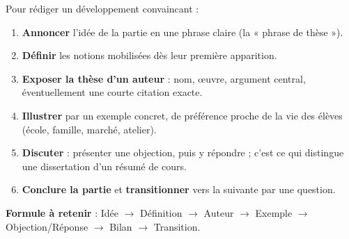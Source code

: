 \documentclass[11pt]{article}
\begin{document}
\begin{methode}
Pour rédiger un développement convaincant :
\begin{enumerate}
\item \textbf{Annoncer} l'idée de la partie en une phrase claire (la « phrase de thèse »).
\item \textbf{Définir} les notions mobilisées dès leur première apparition.
\item \textbf{Exposer la thèse d'un auteur} : nom, œuvre, argument central, éventuellement une courte citation exacte.
\item \textbf{Illustrer} par un exemple concret, de préférence proche de la vie des élèves (école, famille, marché, atelier).
\item \textbf{Discuter} : présenter une objection, puis y répondre ; c'est ce qui distingue une dissertation d'un résumé de cours.
\item \textbf{Conclure la partie} et \textbf{transitionner} vers la suivante par une question.
\end{enumerate}
\textbf{Formule à retenir} : Idée $\rightarrow$ Définition $\rightarrow$ Auteur $\rightarrow$ Exemple $\rightarrow$ Objection/Réponse $\rightarrow$ Bilan $\rightarrow$ Transition.
\end{methode}
\end{document}
